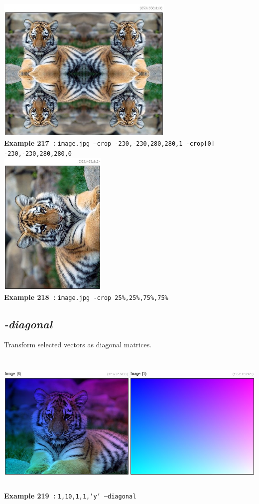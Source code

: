 \documentclass[a4paper,11pt,twoside]{book}
\begin{document}
\begin{center}\includegraphics[keepaspectratio=true,height=7cm,width=\textwidth]{img/gmic_def217.jpg}\\
{\footnotesize \textbf{Example 217~:} \texttt{image.jpg --crop -230,-230,280,280,1 -crop[0] -230,-230,280,280,0}}
\\\includegraphics[keepaspectratio=true,height=7cm,width=\textwidth]{img/gmic_def218.jpg}\\
{\footnotesize \textbf{Example 218~:} \texttt{image.jpg -crop 25\%,25\%,75\%,75\%}}
\end{center}

\subsection{\emph{-diagonal} }\vspace*{-0.5em}
Transform selected vectors as diagonal matrices.
\begin{center}\includegraphics[keepaspectratio=true,height=7cm,width=\textwidth]{img/gmic_def219.jpg}\\
{\footnotesize \textbf{Example 219~:} \texttt{1,10,1,1,'y' --diagonal}}
\end{center}
\end{document}
